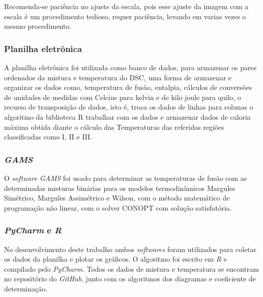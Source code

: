 Recomenda-se paciência no ajuste da escala, pois esse ajuste da imagem com a escala é um procedimento tedioso, requer paciência, levando em varias vezes o mesmo procedimento.

\subsubsection{Planilha eletrônica}
A planilha eletrônica foi utilizada como banco de dados, para armazenar os pares ordenados da mistura e temperatura do DSC, uma forma de armazenar e organizar os dados como, temperatura de fusão, entalpia, cálculos de conversões de unidades de medidas com Celcius para kelvin e  de kilo joule para quilo, o recurso de transposição de dados, isto é, troca os dados de linhas para colunas  o algoritmo da biblioteca R trabalhar com os dados e armazenar dados de caloria máxima obtida diante o cálculo das Temperaturas das referidas regiões classificadas como I, II e III. 

\subsubsection{\textit{GAMS}}
O \textit{software} \textit{GAMS} foi usado para determinar as temperaturas de fusão com as determinadas misturas binárias para os modelos termodinâmicos Margules Simétrico, Margules Assimétrico e Wilson, com o método matemático de  programação não linear, com o solver CONOPT com solução satisfatória.

\subsubsection{\textit{PyCharm} e \textit{R}}
No desenvolvimento deste trabalho ambos \textit{softwares} foram utilizados para coletar os dados da planilha e plotar os gráficos. O algoritmo foi escrito em \textit{R} e compilado pelo \textit{PyCharm}. Todos os dados de mistura e temperatura se encontram no repositório do \textit{GitHub}, junto com os algoritmos dos diagramas e coeficiente de determinação.
